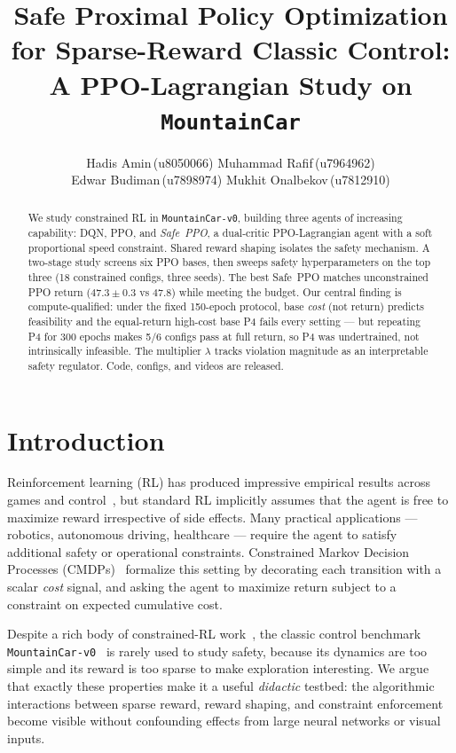 \documentclass{article}
\title{Safe Proximal Policy Optimization for Sparse-Reward Classic Control: \\
A PPO-Lagrangian Study on \texttt{MountainCar}}
\author{Hadis Amin\,(u8050066) \quad Muhammad Rafif\,(u7964962) \\[2pt]
Edwar Budiman\,(u7898974) \quad Mukhit Onalbekov\,(u7812910)}
\date{}
\begin{document}
\maketitle

\begin{abstract}
We study constrained RL in \texttt{MountainCar-v0}, building three agents of increasing capability: DQN, PPO, and \emph{Safe~PPO}, a dual-critic PPO-Lagrangian agent with a soft proportional speed constraint. Shared reward shaping isolates the safety mechanism. A two-stage study screens six PPO bases, then sweeps safety hyperparameters on the top three (18 constrained configs, three seeds). The best Safe~PPO matches unconstrained PPO return ($47.3 \pm 0.3$ vs $47.8$) while meeting the budget. Our central finding is compute-qualified: under the fixed 150-epoch protocol, base \emph{cost} (not return) predicts feasibility and the equal-return high-cost base P4 fails every setting --- but repeating P4 for 300 epochs makes 5/6 configs pass at full return, so P4 was undertrained, not intrinsically infeasible. The multiplier $\lambda$ tracks violation magnitude as an interpretable safety regulator. Code, configs, and videos are released.
\end{abstract}


\section{Introduction}
\label{sec:intro}

Reinforcement learning (RL) has produced impressive empirical results across games and control~\citep{mnih2015dqn,schulman2017ppo}, but standard RL implicitly assumes that the agent is free to
maximize reward irrespective of side effects. Many practical applications --- robotics, autonomous
driving, healthcare --- require the agent to satisfy additional safety or operational
constraints. Constrained Markov Decision Processes (CMDPs)~\citep{altman1999cmdp} formalize this
setting by decorating each transition with a scalar \emph{cost} signal, and asking the agent to
maximize return subject to a constraint on expected cumulative cost.

Despite a rich body of constrained-RL work~\citep{achiam2017cpo,ray2019benchmarking,stooke2020responsive,tessler2018reward,chow2018risk},
the classic control benchmark \texttt{MountainCar-v0}~\citep{moore1990mountaincar,brockman2016openaigym}
is rarely used to study safety, because its dynamics are too simple and its reward is too sparse
to make exploration interesting. We argue that exactly these properties make it a useful
\emph{didactic} testbed: the algorithmic interactions between sparse reward, reward shaping, and
constraint enforcement become visible without confounding effects from large neural networks or
visual inputs.
\end{document}
